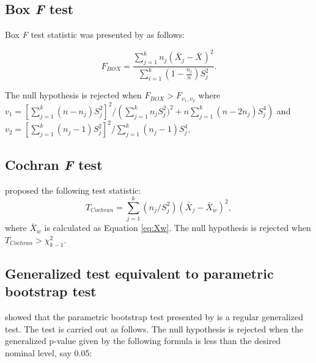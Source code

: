 \subsection{Box \textit{F} test}
Box \textit{F} test statistic was presented by \cite{box1954some} as follows:

\begin{equation}
F_{BOX}=\frac{\displaystyle\sum\limits_{j=1}^kn_j(\bar{X}_{j}-\bar{X}_{})^2}{\displaystyle\sum\limits_{i=1}^k (1-\frac{n_j}{n})S_j^2}. 
\end{equation}

\noindent The null hypothesis is rejected when \begin{math} F_{BOX}>F_{v_1, v_2} \end{math} where \begin{math}
v_1={[\displaystyle\sum\limits_{j=1}^k (n-n_{j})S_j^2]^2}/({\displaystyle\sum\limits_{j=1}^k n_{j}S_j^2
)^2+n\displaystyle\sum\limits_{j=1}^k (n-2n_{j})S_j^4})
\end{math} and \begin{math} 
v_2={[\displaystyle\sum\limits_{j=1}^k (n_{j}-1)S_j^2]^2}/{\displaystyle\sum\limits_{j=1}^k (n_{j}-1)S_j^4} \end{math}.


\subsection{Cochran \textit{F} test}
\citet{cochran1937} proposed the following test statistic:
\begin{equation}\label{eq:Cochran}
T_{Cochran}={\displaystyle\sum\limits_{j=1}^k ({n_j}/{S_j^2})}(\bar{X}_j-\bar{X}_w)^2,
\end{equation}
where \begin{math}\bar{X}_{w}\end{math} is calculated as Equation \ref{eq:Xw}. The null hypothesis is rejected when \begin{math} T_{Cochran}>\chi_{k-1}^2 \end{math}.

\subsection{Generalized test equivalent to parametric bootstrap test}
\cite{weerahandi2019} showed that the parametric bootstrap test presented by \cite{krishnamoorthy2007} is a regular generalized test. The test is carried out as follows. The null hypothesis is rejected when the generalized p-value given by the following formula is less than the desired nominal level, say 0.05:

